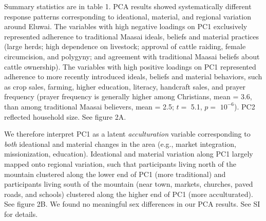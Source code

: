 \documentclass[
  11pt,
]{article}
\begin{document}
Summary statistics are in table 1. PCA results showed systematically
different response patterns corresponding to ideational, material, and
regional variation around Eluwai. The variables with high negative
loadings on PC1 exclusively represented adherence to traditional Maasai
ideals, beliefs and material practices (large herds; high dependence on
livestock; approval of cattle raiding, female circumcision, and
polygyny; and agreement with traditional Maasai beliefs about cattle
ownership). The variables with high positive loadings on PC1 represented
adherence to more recently introduced ideals, beliefs and material
behaviors, such as crop sales, farming, higher education, literacy,
handcraft sales, and prayer frequency (prayer frequency is generally
higher among Christians, mean = 3.6, than among traditional Maasai
believers, mean = 2.5; \(t=\) 5.1, \(p=\) \(\ensuremath{10^{-6}}\)). PC2
reflected household size. See figure 2A.

We therefore interpret PC1 as a latent \emph{acculturation} variable
corresponding to \emph{both} ideational and material changes in the area
(e.g., market integration, missionization, education). Ideational and
material variation along PC1 largely mapped onto regional variation,
such that participants living north of the mountain clustered along the
lower end of PC1 (more traditional) and participants living south of the
mountain (near town, markets, churches, paved roads, and schools)
clustered along the higher end of PC1 (more acculturated). See figure
2B. We found no meaningful sex differences in our PCA results. See SI
for details.
\end{document}
